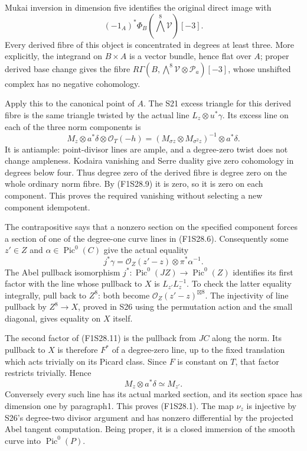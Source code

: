 Mukai inversion in dimension five identifies the original
direct image with
\[
        (-1_A)^*\Phi_B(\bigwedge^8\mathcal V)[-3].
 \tag{F1S28.9}
\]
Every derived fibre of this object is concentrated in
degrees at least three. More explicitly, the integrand
on $B\times A$ is a vector bundle, hence flat over $A$;
proper derived base change gives the fibre
$R\Gamma(B,\bigwedge^8\mathcal V\otimes\mathcal P_a)[-3]$,
whose unshifted complex has no negative cohomology.

Apply this to the canonical point of $A$. The S21 excess
triangle for this derived fibre is the same triangle
twisted by the actual line $L_z\otimes u^*\gamma$.
Its excess line on each of the three norm components is
\[
 M_z\otimes a^*\delta\otimes\mathcal O_T(-h)
      =(M_{\sigma z}\otimes M_{\sigma^2z})^{-1}
                                      \otimes a^*\delta.
 \tag{F1S28.10}
\]
It is antiample: point-divisor lines are ample, and a
degree-zero twist does not change ampleness. Kodaira
vanishing and Serre duality give zero cohomology in
degrees below four. Thus degree zero of the derived
fibre is degree zero on the whole ordinary norm fibre.
By (F1S28.9) it is zero, so it is zero on each component.
This proves the required vanishing without selecting a
new component idempotent.

The contrapositive says that a nonzero section on the
specified component forces a section of one of the
degree-one curve lines in (F1S28.6). Consequently some
$z'\in Z$ and $\alpha\in\operatorname{Pic}^0(C)$ give
the actual equality
\[
                       j^*\gamma
                  =\mathcal O_Z(z'-z)\otimes\pi^*\alpha^{-1}.
 \tag{F1S28.11}
\]
The Abel pullback isomorphism
$j^*:\operatorname{Pic}^0(JZ)\to\operatorname{Pic}^0(Z)$
identifies its first factor with the line whose pullback
to $X$ is $L_{z'}L_z^{-1}$. To check the latter equality
integrally, pull back to $Z^8$: both become
$\mathcal O_Z(z'-z)^{\boxtimes8}$. The injectivity of
line pullback by $Z^8\to X$, proved in S26 using the
permutation action and the small diagonal, gives equality
on $X$ itself.

The second factor of (F1S28.11) is the pullback from
$JC$ along the norm. Its pullback to $X$ is therefore
$F^*$ of a degree-zero line, up to the fixed translation
which acts trivially on its Picard class. Since $F$ is
constant on $T$, that factor restricts trivially. Hence
\[
                         M_z\otimes a^*\delta\simeq M_{z'}.
 \tag{F1S28.12}
\]
Conversely every such line has its actual marked section,
and its section space has dimension one by paragraph1.
This proves (F1S28.1). The map $\nu_z$ is injective by
S26's degree-two divisor argument and has nonzero
differential by the projected Abel tangent computation.
Being proper, it is a closed immersion of the smooth
curve into $\operatorname{Pic}^0(P)$.

